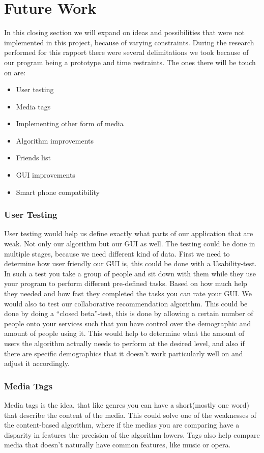 \section{Future Work}
\label{conclusion:FutureWork}

In this closing section we will expand on ideas and possibilities that were not implemented in this project, because of varying constraints. During the research performed for this rapport there were several delimitations we took because of our program being a prototype and time restraints. The ones there will be touch on are:
\begin{itemize}
	\item User testing
	\item Media tags
	\item Implementing other form of media
	\item Algorithm improvements
	\item Friends list
	\item GUI improvements
	\item Smart phone compatibility 
\end{itemize}

\subsubsection{User Testing}
User testing would help us define exactly what parts of our application that are weak. Not only our algorithm but our GUI as well. The testing could be done in multiple stages, because we need different kind of data. First we need to determine how user friendly our GUI is, this could be done with a Usability-test. In such a test you take a group of people and sit down with them while they use your program to perform different pre-defined tasks. Based on how much help they needed and how fast they completed the tasks you can rate your GUI. We would also to test our collaborative recommendation algorithm. This could be done by doing a “closed beta”-test, this is done by allowing a certain number of people onto your services such that you have control over the demographic and amount of people using it. This would help to determine what the amount of users the algorithm actually needs to perform at the desired level, and also if there are specific demographics that it doesn't work particularly well on and adjust it accordingly.

\subsubsection{Media Tags}\label{futureWork:Tags}
Media tags is the idea, that like genres you can have a short(mostly one word) that describe the content of the media. This could solve one of the weaknesses of the content-based algorithm, where if the medias you are comparing have a disparity in features the precision of the algorithm lowers. Tags also help compare media that doesn't naturally have common features, like music or opera.

